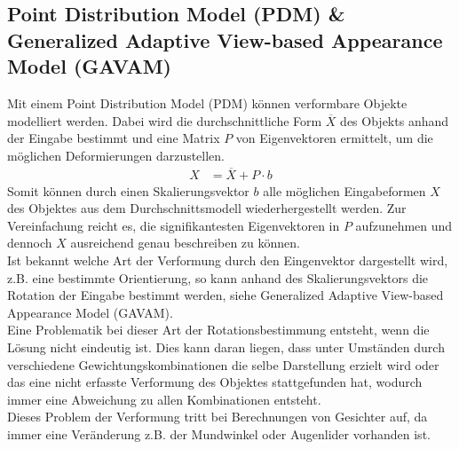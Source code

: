 \subsection{Point Distribution Model (PDM) \& Generalized Adaptive View-based Appearance Model (GAVAM)}
Mit einem Point Distribution Model (PDM) können verformbare Objekte modelliert werden. Dabei wird die durchschnittliche Form $\overline{X}$ des Objekts anhand der Eingabe bestimmt und eine Matrix $P$ von Eigenvektoren ermittelt, um die möglichen Deformierungen darzustellen.
\begin{align*}
X &= \overline{X}+P\cdot b
\end{align*}
Somit können durch einen Skalierungsvektor $b$ alle möglichen Eingabeformen $X$ des Objektes aus dem Durchschnittsmodell wiederhergestellt werden. Zur Vereinfachung reicht es, die signifikantesten Eigenvektoren in $P$ aufzunehmen und dennoch $X$ ausreichend genau beschreiben zu können.\\
Ist bekannt welche Art der Verformung durch den Eingenvektor dargestellt wird, z.B. eine bestimmte Orientierung, so kann anhand des Skalierungsvektors die Rotation der Eingabe bestimmt werden, siehe Generalized Adaptive View-based Appearance Model (GAVAM).\\
Eine Problematik bei dieser Art der Rotationsbestimmung entsteht, wenn die Lösung nicht eindeutig ist. Dies kann daran liegen, dass unter Umständen durch verschiedene Gewichtungskombinationen die selbe Darstellung erzielt wird oder das eine nicht erfasste Verformung des Objektes stattgefunden hat, wodurch immer eine Abweichung zu allen Kombinationen entsteht.\\
Dieses Problem der Verformung tritt bei Berechnungen von Gesichter auf, da immer eine Veränderung z.B. der Mundwinkel oder Augenlider vorhanden ist.
\cite{pdf_PDM}\cite{pdf_GAVAM}\cite{wiki_PDM}